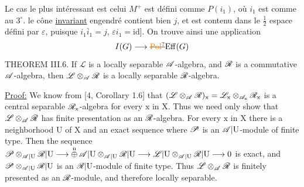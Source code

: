 Le cas le plus intéressant est celui   $M^+$  est défini comme $P(i_1)$, où $i_1$ est comme au $3^{\circ}$.  \inserted{[N.B.} le cône \uline{invariant} engendré contient bien $j$, et est contenu dans le $\frac12$ espace défini par $\varepsilon$, puisque $i_1\bar i_1=j$, $\varepsilon i_1=\mathrm{id}$]. On trouve ainsi une application
\[
I(G)\longrightarrow\deleted{\unsure{\mathrm{Pol}}}\mathrm{Eff}(G)
\]
THEOREM III.6. If $\mathscr{L}$ is a locally separable $\mathscr{A}$-algebra, and $\mathscr{R}$ is a commutative $\mathscr{A}$-algebra, then $\mathscr{L}\otimes_{\mathscr{A}}\mathscr{R}$ is a locally separable $\mathscr{R}$-algebra.

\uline{Proof:} We know\handwritten{\unsure{,|$\swarrow$}} from [4, Corollary 1.6] that $(\mathscr{L}\otimes_{\mathscr{A}}\mathscr{R})_{\mathrm x}=\mathscr{L}_{\mathrm x}\otimes_{\mathscr{A}_{\mathrm x}}\mathscr{R}_{\mathrm x}$ is a central separable $\mathscr{R}_{\mathrm x}$-algebra for every $\mathrm x$ in $\mathrm X$. Thus we need only show that $\mathscr{L}\otimes_{\mathscr{A}}\mathscr{R}$ has finite presentation as an $\mathscr{R}$-algebra. For every $\mathrm x$ in $\mathrm X$ there is a neighborhood $\mathrm U$ of $\mathrm X$ and an exact sequence
where $\mathscr{P}$ is an $\mathscr{A}|\mathrm U$-module of finite type. Then the sequence $\mathscr{P}\otimes_{\mathscr{A}|\mathrm U}\mathscr{R}|\mathrm U\longrightarrow\overset{\mathrm n}{\oplus}\,\mathscr{A}|\mathrm U\otimes_{\mathscr{A}|\mathrm U}\mathscr{R}|\mathrm U\longrightarrow \mathscr{L}|\mathrm U\otimes_{\mathscr{A}|\mathrm U}\mathscr{R}|\mathrm U\longrightarrow 0$ is exact, and $\mathscr{P}\otimes_{\mathscr{A}|\mathrm U}\mathscr{R}|\mathrm U$ is an $\mathscr{R}|\mathrm U$-module of finite type. Thus $\mathscr{L}\otimes_{\mathscr{A}}\mathscr{R}$ is finitely presented as an $\mathscr{R}$-module, and therefore locally separable.

